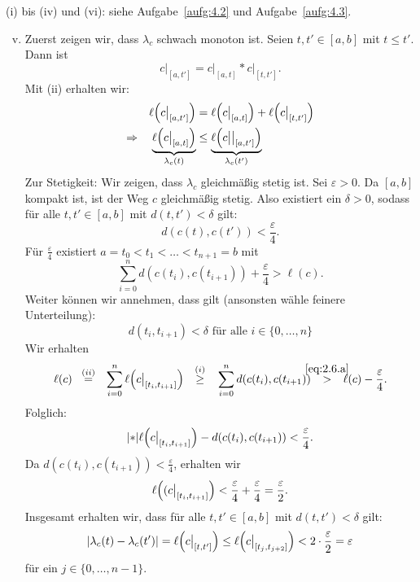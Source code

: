 \begin{beweis}
	(i) bis (iv) und (vi): siehe Aufgabe~\ref{aufg:4.2} und Aufgabe~\ref{aufg:4.3}.
	\begin{enumerate}[(i)]
		\setcounter{enumi}{4}
		\item Zuerst zeigen wir, dass $\lambda_c$ schwach monoton ist.
		Seien $t, t' \in [a,b]$ mit $t \leq t'$.
		Dann ist
		\[
			c \big|_{[a,t']} = c \big|_{[a,t]} * c\big|_{[t,t']}.
		\]
		Mit (ii) erhalten wir:
		\begin{align*}
			\ell\enbrace*{c \big|_{[a,t']}} &= \ell \enbrace*{c \big|_{[a,t]}} + \ell \enbrace*{c\big|_{[t,t']}} \\
			\Rightarrow \quad \Underbrace{\ell\enbrace*{c \big|_{[a,t]}}}{\lambda_c(t)} &\leq \Underbrace{\ell\enbrace*{c \big|\big|_{[a,t']}}}{\lambda_c(t')}
		\end{align*}
		Zur Stetigkeit:
		Wir zeigen, dass $\lambda_c$ gleichmäßig stetig ist.
		Sei $\varepsilon > 0$.
		Da $[a,b]$ kompakt ist, ist der Weg $c$ gleichmäßig stetig.
		Also existiert ein $\delta > 0$, sodass für alle $t, t' \in [a,b]$ mit $d(t,t') < \delta$ gilt:
		\[
			d(c(t),c(t')) < \frac{\varepsilon}{4}.
		\]
		Für $\frac{\varepsilon}{4}$ existiert $a = t_0 < t_1 < \dots < t_{n+1} = b$ mit
		\begin{equation}
			\sum\limits_{i=0}^{n} d(c(t_i),c(t_{i+1})) + \frac{\varepsilon}{4} > \ell(c). \label{eq:2.6.a}
		\end{equation}
		Weiter können wir annehmen, dass gilt (ansonsten wähle feinere Unterteilung):
		\begin{equation}
			d(t_i,t_{i+1}) < \delta \text{ für alle } i \in \{0,\dots,n\} \label{eq:2.6.b}
		\end{equation}
		Wir erhalten
		\begin{equation}
			\ell(c) \stack{(ii)}{=} \sum\limits_{i=0}^{n} \ell\enbrace*{ c\big|_{[t_i,t_{i+1}]}} \stack{(i)}{\geq} \sum\limits_{i=0}^n d(c(t_i),c(t_{i+1})) \stack{\eqref{eq:2.6.a}}{>} \ell(c) - \frac{\varepsilon}{4}.
		\end{equation}
		Folglich:
		\[
			\abs*{\ell\enbrace*{c\big|_{[t_i,t_{i+1}]}} - d(c(t_i),c(t_{i+1}))} < \frac{\varepsilon}{4}.
		\]
		Da $d(c(t_i),c(t_{i+1})) < \frac{\varepsilon}{4}$, erhalten wir
		\[
			\ell\enbrace*{(c \big|_{[t_i,t_{i+1}]}} < \frac{\varepsilon}{4} + \frac{\varepsilon}{4} = \frac{\varepsilon}{2}.
		\]
		Insgesamt erhalten wir, dass für alle $t,t' \in [a,b]$ mit $d(t,t') < \delta$ gilt:
		\[
			\abs{\lambda_c(t)-\lambda_c(t')} = \ell\enbrace*{c \big|_{[t,t']}} \leq \ell\enbrace*{c\big|_{[t_j,t_{j+2}]}} < 2 \cdot \frac{\varepsilon}{2} = \varepsilon
		\]
		für ein $j \in \{0, \dots, n-1\}$.
		

\end{enumerate}
\end{beweis}
